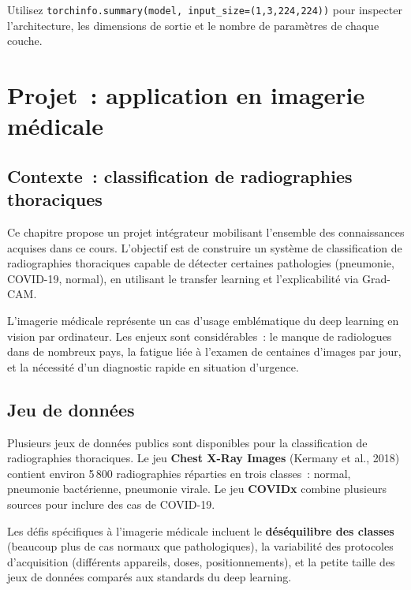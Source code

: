 \documentclass[a4paper,11pt,twoside]{book}
\begin{document}
\begin{notebox}[Conseil]
Utilisez \texttt{torchinfo.summary(model, input\_size=(1,3,224,224))} pour inspecter l'architecture, les dimensions de sortie et le nombre de paramètres de chaque couche.
\end{notebox}


\chapter{Projet~: application en imagerie médicale}

\section{Contexte~: classification de radiographies thoraciques}

Ce chapitre propose un projet intégrateur mobilisant l'ensemble des connaissances acquises dans ce cours. L'objectif est de construire un système de classification de radiographies thoraciques capable de détecter certaines pathologies (pneumonie, COVID-19, normal), en utilisant le transfer learning et l'explicabilité via Grad-CAM.

L'imagerie médicale représente un cas d'usage emblématique du deep learning en vision par ordinateur. Les enjeux sont considérables~: le manque de radiologues dans de nombreux pays, la fatigue liée à l'examen de centaines d'images par jour, et la nécessité d'un diagnostic rapide en situation d'urgence.

\section{Jeu de données}

Plusieurs jeux de données publics sont disponibles pour la classification de radiographies thoraciques. Le jeu \textbf{Chest X-Ray Images} (Kermany et al., 2018) contient environ 5\,800 radiographies réparties en trois classes~: normal, pneumonie bactérienne, pneumonie virale. Le jeu \textbf{COVIDx} combine plusieurs sources pour inclure des cas de COVID-19.

Les défis spécifiques à l'imagerie médicale incluent le \textbf{déséquilibre des classes} (beaucoup plus de cas normaux que pathologiques), la variabilité des protocoles d'acquisition (différents appareils, doses, positionnements), et la petite taille des jeux de données comparés aux standards du deep learning.
\end{document}
